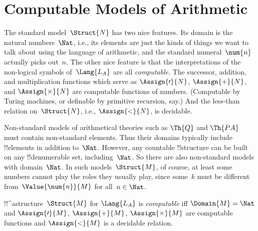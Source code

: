 \documentclass[../../../include/open-logic-section]{subfiles}
\begin{document}
\section{Computable Models of Arithmetic}

\begin{explain}
The standard model~$\Struct{N}$ has two nice features. Its domain is
the natural numbers~$\Nat$, i.e., its elements are just the kinds of
things we want to talk about using the language of arithmetic, and the
standard numeral~$\num{n}$ actually picks out~$n$. The other nice
feature is that the interpretations of the non-logical symbols
of~$\Lang{L_A}$ are all \emph{computable}. The successor, addition,
and multiplication functions which serve as $\Assign{\prime}{N}$,
$\Assign{+}{N}$, and $\Assign{\times}{N}$ are computable functions of
numbers. (Computable by Turing machines, or definable by primitive
recursion, say.) And the less-than relation on~$\Struct{N}$, i.e.,
$\Assign{<}{N}$, is decidable.

Non-standard models of arithmetical theories such as $\Th{Q}$ and
$\Th{PA}$ must contain non-standard elements. Thus their domains
typically include !!{element}s in addition to~$\Nat$. However, any
countable !!{structure} can be built on any !!{denumerable} set,
including~$\Nat$. So there are also non-standard models with
domain~$\Nat$. In such models~$\Struct{M}$, of course, at least some
numbers cannot play the roles they usually play, since some~$k$ must
be different from~$\Value{\num{n}}{M}$ for all~$n \in \Nat$.
\end{explain}

\begin{defn}
!!^a{structure}~$\Struct{M}$ for $\Lang{L_A}$ is \emph{computable} iff
  $\Domain{M} = \Nat$ and $\Assign{\prime}{M}$, $\Assign{+}{M}$,
  $\Assign{\times}{M}$ are computable functions and $\Assign{<}{M}$ is
  a decidable relation.
\end{defn}
\end{document}
